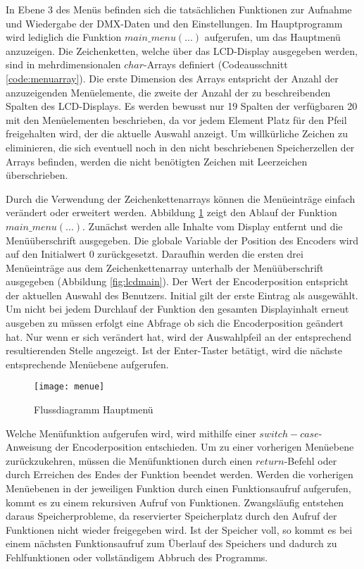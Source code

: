 In Ebene 3 des Menüs befinden sich die tatsächlichen Funktionen zur Aufnahme und Wiedergabe der DMX-Daten und den Einstellungen. Im Hauptprogramm wird lediglich die Funktion $main\_menu(...)$ aufgerufen, um das Hauptmenü anzuzeigen. Die Zeichenketten, welche über das LCD-Display ausgegeben werden, sind in mehrdimensionalen $char$-Arrays definiert (Codeausschnitt \ref{code:menuarray}). Die erste Dimension des Arrays entspricht der Anzahl der anzuzeigenden Menüelemente, die zweite der Anzahl der zu beschreibenden Spalten des LCD-Displays. Es werden bewusst nur 19 Spalten der verfügbaren 20 mit den Menüelementen beschrieben, da vor jedem Element Platz für den Pfeil freigehalten wird, der die aktuelle Auswahl anzeigt. Um willkürliche Zeichen zu eliminieren, die sich eventuell noch in den nicht beschriebenen Speicherzellen der Arrays befinden, werden die nicht benötigten Zeichen mit Leerzeichen überschrieben.

Durch die Verwendung der Zeichenkettenarrays können die Menüeinträge einfach verändert oder erweitert werden. Abbildung \ref{fig:flusshauptmenu} zeigt den Ablauf der Funktion $main\_menu(...)$. Zunächst werden alle Inhalte vom Display entfernt und die Menüüberschrift ausgegeben. Die globale Variable der Position des Encoders wird auf den Initialwert 0 zurückgesetzt. Daraufhin werden die ersten drei Menüeinträge aus dem Zeichenkettenarray unterhalb der Menüüberschrift ausgegeben (Abbildung \ref{fig:lcdmain}). Der Wert der Encoderposition entspricht der aktuellen Auswahl des Benutzers. Initial gilt der erste Eintrag als ausgewählt. Um nicht bei jedem Durchlauf der Funktion den gesamten Displayinhalt erneut ausgeben zu müssen erfolgt eine Abfrage ob sich die Encoderposition geändert hat. Nur wenn er sich verändert hat, wird der Auswahlpfeil an der entsprechend resultierenden Stelle angezeigt. Ist der Enter-Taster betätigt, wird die nächste entsprechende Menüebene aufgerufen.
\begin{figure}[h]
	\centering
	\texttt{[image: menue]}
	\caption{Flussdiagramm Hauptmenü}
	\label{fig:flusshauptmenu}
\end{figure}
Welche Menüfunktion aufgerufen wird, wird mithilfe einer $switch-case$-Anweisung der Encoderposition entschieden. 
\newline
Um zu einer vorherigen Menüebene zurückzukehren, müssen die Menüfunktionen durch einen $return$-Befehl oder durch Erreichen des Endes der Funktion beendet werden. Werden die vorherigen Menüebenen in der jeweiligen Funktion durch einen Funktionsaufruf aufgerufen, kommt es zu einem rekursiven Aufruf von Funktionen. Zwangsläufig entstehen daraus Speicherprobleme, da reservierter Speicherplatz durch den Aufruf der Funktionen nicht wieder freigegeben wird. Ist der Speicher voll, so kommt es bei einem nächsten Funktionsaufruf zum Überlauf des Speichers und dadurch zu Fehlfunktionen oder vollständigem Abbruch des Programms.